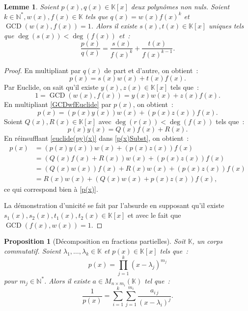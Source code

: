 \documentclass{article}
\DeclareMathOperator{\GCD}{GCD}
\newcommand{\N}{\mathbb N}
\newcommand{\K}{\mathbb K}
\newcommand{\M}[3]{M_{#1 \times #2}(#3)}
\newtheorem{prp}[thm]{Proposition}
\newtheorem{lem}[thm]{Lemme}
\theoremstyle{definition}
\theoremstyle{remark}
\begin{document}
		\begin{lem} Soient $p(x), q(x) \in \K[x]$ deux polynômes non nuls. Soient $k \in \N^*, w(x), f(x) \in \K$ tels que $q(x) = w(x)f(x)^k$ et $\GCD(w(x), f(x)) = 1$.
		Alors il existe $s(x), t(x) \in \K[x]$ uniques  tels que $\deg(s(x)) < \deg(f(x))$ et~:
		\[\frac {p(x)}{q(x)} = \frac {s(x)}{f(x)^k} + \frac {t(x)}{f(x)^{k-1}}.\] \end{lem}

		\begin{proof} En multipliant par $q(x)$ de part et d'autre, on obtient~:
		\begin{equation}\label{p(x)}
			p(x) = s(x)w(x) + t(x)f(x).
		\end{equation}
		Par Euclide, on sait qu'il existe $y(x), z(x) \in \K[x]$ tels que~:
		\begin{equation}\label{GCDwfEuclide}
			1 = \GCD(w(x), f(x)) = y(x)w(x) + z(x)f(x).
		\end{equation}
		En multipliant \eqref{GCDwfEuclide} par $p(x)$, on obtient~:
		\begin{equation}\label{p(x)Subst}
			p(x) = \left(p(x)y(x)\right)w(x) + \left(p(x)z(x)\right)f(x).
		\end{equation}
		Soient $Q(x), R(x) \in \K[x]$ avec $\deg(r(x)) < \deg(f(x))$ tels que~:
		\begin{equation}\label{euclide(py)(x)}
			p(x)y(x) = Q(x)f(x) + R(x).
		\end{equation}
		En réinsufflant \eqref{euclide(py)(x)} dans \eqref{p(x)Subst}, on obtient~:
		\begin{align*}
			p(x) &= \left(p(x)y(x)\right)w(x) + \left(p(x)z(x)\right)f(x) \\
			     &= \left(Q(x)f(x) + R(x)\right)w(x) + \left(p(x)z(x)\right)f(x) \\
				 &= \left(Q(x)w(x)\right)f(x) + R(x)w(x) + \left(p(x)z(x)\right)f(x) \\
				 &= R(x)w(x) + \left(Q(x)w(x) + p(x)z(x)\right)f(x),
		\end{align*}
		ce qui correspond bien à \eqref{p(x)}.

		La démonstration d'unicité se fait par l'absurde en supposant qu'il existe $s_1(x), s_2(x), t_1(x), t_2(x) \in \K[x]$ et avec le fait que
		$\GCD(f(x), w(x)) = 1$. \end{proof}

		\begin{prp}[Décomposition en fractions partielles] Soit $\K$, un corps commutatif. Soient $\lambda_1, \dotsc, \lambda_k \in \K$ et
		$p(x) \in \K[x]$ tels que~:
		\[p(x) = \prod_{j=1}^k(x-\lambda_j)^{m_j}\]
		pour $m_j \in \N^*$. Alors il existe $a \in \M n{m_i}\K$ tel que~:
		\[\frac 1{p(x)} = \sum_{i=1}^k\sum_{j=1}^{m_i}\frac {a_{i\,j}}{(x-\lambda_i)^j}.\] \end{prp}
\end{document}
